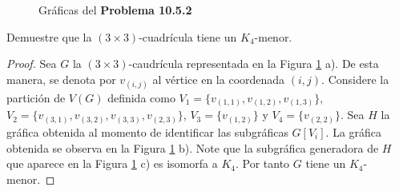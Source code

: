 \documentclass[12pt]{article}
\newenvironment{problem}[2][Problema]{\begin{trivlist}
\item[\hskip \labelsep {\bfseries #1}\hskip \labelsep {\bfseries #2.}]}{\end{trivlist}}
\begin{document}
\begin{figure}
    \caption{Gráficas del \textbf{Problema 10.5.2}}
    \label{fig:f1}
\end{figure}

\begin{problem}{10.5.2}
Demuestre que la $(3 \times 3)$-cuadrícula tiene un $K_4$-menor.
\end{problem}
\begin{proof}
Sea $G$ la $(3 \times 3)$-caudrícula representada en la Figura \ref{fig:f1} a). De esta manera, se denota por $v_{(i,j)}$ al vértice en la coordenada $(i,j)$. Considere la partición de $V(G)$ definida como $V_1 = \{v_{(1,1)}, v_{(1,2)}, v_{(1,3)}\},$ $V_2 = \{v_{(3,1)}, v_{(3,2)}, v_{(3,3)}, v_{(2,3)}\}$, $V_3 = \{v_{(1,2)}\}$ y $V_4 = \{v_{(2,2)}\}.$ Sea $H$ la gráfica obtenida al momento de identificar las subgráficas $G[V_i].$ La gráfica obtenida se observa en la Figura \ref{fig:f1} b). Note que la subgráfica generadora de $H$ que aparece en la Figura \ref{fig:f1} c) es isomorfa a $K_4.$ Por tanto $G$ tiene un $K_4$-menor.
\end{proof}
\end{document}
